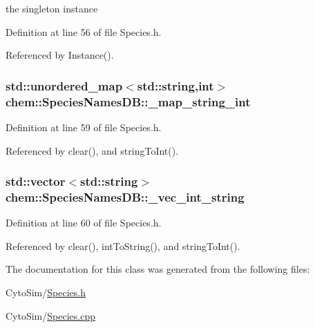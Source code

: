 the singleton instance 



Definition at line 56 of file Species.\-h.



Referenced by Instance().

\hypertarget{classchem_1_1SpeciesNamesDB_a2c70229e074e0997a876559ecb622fbb}{
\subsubsection[{\-\_\-map\-\_\-string\-\_\-int}]{\setlength{\rightskip}{0pt plus 5cm}std\-::unordered\-\_\-map$<$std\-::string,int$>$ {\bf chem\-::\-Species\-Names\-D\-B\-::\-\_\-map\-\_\-string\-\_\-int}}}\label{classchem_1_1SpeciesNamesDB_a2c70229e074e0997a876559ecb622fbb}


Definition at line 59 of file Species.\-h.



Referenced by clear(), and string\-To\-Int().

\hypertarget{classchem_1_1SpeciesNamesDB_ae9184194e3b6d35c36b43020bde04724}{
\subsubsection[{\-\_\-vec\-\_\-int\-\_\-string}]{\setlength{\rightskip}{0pt plus 5cm}std\-::vector$<$std\-::string$>$ {\bf chem\-::\-Species\-Names\-D\-B\-::\-\_\-vec\-\_\-int\-\_\-string}}}\label{classchem_1_1SpeciesNamesDB_ae9184194e3b6d35c36b43020bde04724}


Definition at line 60 of file Species.\-h.



Referenced by clear(), int\-To\-String(), and string\-To\-Int().



The documentation for this class was generated from the following files\-:\begin{DoxyCompactItemize}
\item 
Cyto\-Sim/\hyperlink{Species_8h}{Species.\-h}\item 
Cyto\-Sim/\hyperlink{Species_8cpp}{Species.\-cpp}\end{DoxyCompactItemize}
